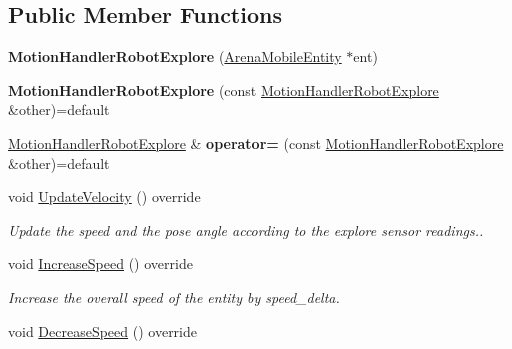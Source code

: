 \subsection*{Public Member Functions}
\begin{DoxyCompactItemize}
\item 
{\bfseries Motion\+Handler\+Robot\+Explore} (\hyperlink{classArenaMobileEntity}{Arena\+Mobile\+Entity} $\ast$ent)\hypertarget{classMotionHandlerRobotExplore_a5d62df9b7ffd800d4b35859ba1a72f3e}{}\label{classMotionHandlerRobotExplore_a5d62df9b7ffd800d4b35859ba1a72f3e}

\item 
{\bfseries Motion\+Handler\+Robot\+Explore} (const \hyperlink{classMotionHandlerRobotExplore}{Motion\+Handler\+Robot\+Explore} \&other)=default\hypertarget{classMotionHandlerRobotExplore_ae82ba22271a4cf497d68f4bcd8c4b4e4}{}\label{classMotionHandlerRobotExplore_ae82ba22271a4cf497d68f4bcd8c4b4e4}

\item 
\hyperlink{classMotionHandlerRobotExplore}{Motion\+Handler\+Robot\+Explore} \& {\bfseries operator=} (const \hyperlink{classMotionHandlerRobotExplore}{Motion\+Handler\+Robot\+Explore} \&other)=default\hypertarget{classMotionHandlerRobotExplore_a4ee07340d788ea4fdc7de86b5f51da02}{}\label{classMotionHandlerRobotExplore_a4ee07340d788ea4fdc7de86b5f51da02}

\item 
void \hyperlink{classMotionHandlerRobotExplore_a88d0b13f1082475630d1955258aaa174}{Update\+Velocity} () override\hypertarget{classMotionHandlerRobotExplore_a88d0b13f1082475630d1955258aaa174}{}\label{classMotionHandlerRobotExplore_a88d0b13f1082475630d1955258aaa174}

\begin{DoxyCompactList}\small\item\em Update the speed and the pose angle according to the explore sensor readings.. \end{DoxyCompactList}\item 
void \hyperlink{classMotionHandlerRobotExplore_aa52a668bd64c17b56dbd0be199cddc2c}{Increase\+Speed} () override\hypertarget{classMotionHandlerRobotExplore_aa52a668bd64c17b56dbd0be199cddc2c}{}\label{classMotionHandlerRobotExplore_aa52a668bd64c17b56dbd0be199cddc2c}

\begin{DoxyCompactList}\small\item\em Increase the overall speed of the entity by speed\+\_\+delta. \end{DoxyCompactList}\item 
void \hyperlink{classMotionHandlerRobotExplore_a8898051b46761b8ba64468a3afa1bbca}{Decrease\+Speed} () override\hypertarget{classMotionHandlerRobotExplore_a8898051b46761b8ba64468a3afa1bbca}{}\label{classMotionHandlerRobotExplore_a8898051b46761b8ba64468a3afa1bbca}


\end{DoxyCompactItemize}
